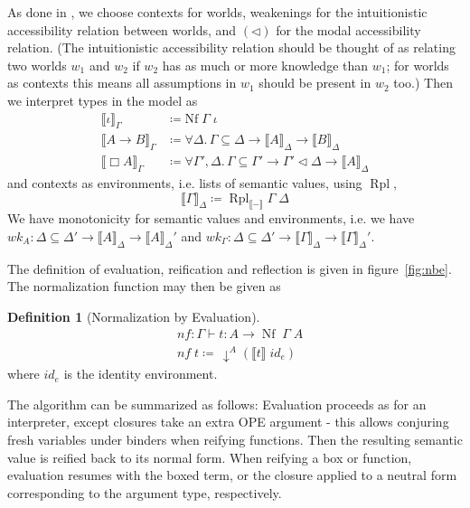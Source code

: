\documentclass{article}
\theoremstyle{definition}\newtheorem{definition}{Definition}
\begin{document}
As done in \cite{valliappan22}, we choose contexts for worlds,
weakenings for the intuitionistic accessibility relation between worlds, and
$(\lhd)$ for the modal accessibility relation.
(The intuitionistic accessibility relation should be thought of as
relating two worlds $w_1$ and $w_2$ if $w_2$ has as much or more knowledge than $w_1$;
for worlds as contexts this means all assumptions in $w_1$ should be present in $w_2$ too.)
Then we interpret types in the model as
\begin{equation}\label{eq:sem-values}
  \begin{split}
  \llbracket \iota \rrbracket_\Gamma &\coloneqq \text{Nf} \; \Gamma \; \iota \\
  \llbracket A \to B \rrbracket_\Gamma &\coloneqq \forall \Delta. \, \Gamma \subseteq \Delta \to \llbracket A \rrbracket_\Delta \to \llbracket B \rrbracket_\Delta \\
  \llbracket \Box A \rrbracket_\Gamma &\coloneqq \forall \Gamma', \Delta. \, \Gamma \subseteq \Gamma' \to \Gamma'\lhd\Delta \to \llbracket A \rrbracket_\Delta
  \end{split}
\end{equation}
and contexts as environments, i.e. lists of semantic values, using $\operatorname{Rpl}$,
$$ \llbracket \Gamma \rrbracket_\Delta \coloneqq \operatorname{Rpl}_{\llbracket-\rrbracket} \Gamma \; \Delta $$
We have monotonicity for semantic values and environments,
i.e. we have
$wk_A : \Delta \subseteq \Delta' \to \llbracket A \rrbracket_\Delta \to \llbracket A \rrbracket_\Delta'$ and
$wk_\Gamma : \Delta \subseteq \Delta' \to \llbracket \Gamma \rrbracket_\Delta \to \llbracket \Gamma \rrbracket_\Delta'$.

The definition of evaluation, reification and reflection is given in figure~\ref{fig:nbe}.
The normalization function may then be given as
\begin{definition}[Normalization by Evaluation]
  \begin{align*}
    &\textit{nf} : \Gamma \vdash t : A \to \operatorname{Nf} \; \Gamma \; A \\
    &\textit{nf} \; t \coloneqq \, \downarrow^A (\llbracket t \rrbracket \; \textit{id}_e)
  \end{align*}
  where $\textit{id}_e$ is the identity environment.
\end{definition}
The algorithm can be summarized as follows:
Evaluation proceeds as for an interpreter,
except closures take an extra OPE argument -
this allows conjuring fresh variables under binders
when reifying functions.
Then the resulting semantic value is reified back to its normal form.
When reifying a box or function,
evaluation resumes with the boxed term,
or the closure applied to a neutral form corresponding to the argument type,
respectively.
\end{document}

